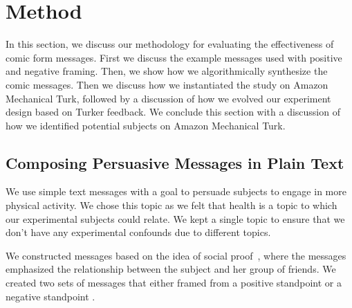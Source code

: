 \section{Method}
\label{sec:Method}

In this section, we discuss our methodology for evaluating the effectiveness of comic form messages. First we discuss the example messages used with positive and negative framing. Then, we show how we algorithmically synthesize the comic messages. Then we discuss how we instantiated the study on Amazon Mechanical Turk, followed by a discussion of how we evolved our experiment design based on Turker feedback. We conclude this section with a discussion of how we identified potential subjects on Amazon Mechanical Turk.

\subsection{Composing Persuasive Messages in Plain Text}
We use simple text messages with a goal to persuade subjects to engage in more physical activity. We chose this topic as we felt that health is a topic to which our experimental subjects could relate. We kept a single topic to ensure that we don't have any experimental confounds due to different topics.


We constructed messages based on the idea of social proof~\cite{goldstein2008room}, where the messages emphasized the relationship between the subject and her group of friends. We created two sets of messages that either framed from a positive standpoint or a negative standpoint \cite{tversky1981framing}.

